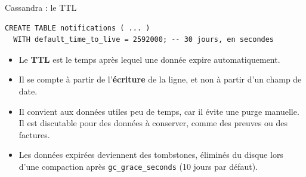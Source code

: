 \begin{frame}[fragile]{Cassandra : le TTL}
    \begin{verbatim}
CREATE TABLE notifications ( ... )
  WITH default_time_to_live = 2592000; -- 30 jours, en secondes
\end{verbatim}
    \begin{itemize}
        \item Le \textbf{TTL} est le temps après lequel une donnée expire
              automatiquement.
        \item Il se compte à partir de l'\textbf{écriture} de la ligne, et non à
              partir d'un champ de date.
        \item Il convient aux données utiles peu de temps, car il évite une
              purge manuelle. Il est discutable pour des données à conserver,
              comme des preuves ou des factures.
        \item Les données expirées deviennent des tombstones, éliminés du disque
              lors d'une compaction après \texttt{gc\_grace\_seconds} (10 jours
              par défaut).
    \end{itemize}
\end{frame}
